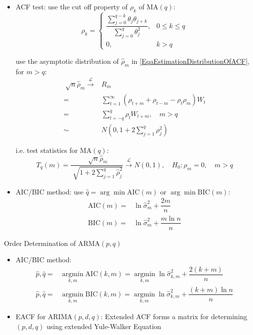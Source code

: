 \begin{itemize}[topsep=2pt,itemsep=0pt]
    \item ACF test: use the cut off property of $ \rho  _k $ of MA$ (q) $:
    \begin{equation}
        \rho  _k=\begin{cases}
            \dfrac{\sum_{j=0}^{q-k}\theta _j\theta _{j+k}}{\sum_{j=0}^q\theta _j^2},&0\leq k\leq q\\
            0,&k>q
        \end{cases} 
    \end{equation}

    use the asymptotic distribution of $ \hat{\rho }_m $ in \autoref{EqaEstimationDistributionOfACF}, for $ m>q $:
    \begin{align}
        \sqrt[]{n}\hat{\rho }_m\xrightarrow[]{\mathscr{L}}& R_m\\
         =&\sum_{t=1}^\infty(\rho _{t+m}+\rho _{t-m}-\rho _t\rho _m)W_t\\
         =&\sum_{l=-q}^q\rho _lW_{l+m},\quad m>q\\
         \sim&N(0,1+2\sum_{j=1}^q\rho _j^2)
    \end{align}
    
    i.e. test statistics for MA$ (q) $:
    \[
        T_q(m)=\dfrac{\sqrt[]{n}\hat{\rho }_m}{\sqrt[]{1+2\sum_{j=1}^q\hat{\rho }_j^2}}\xrightarrow[]{\mathscr{L}} N(0,1),\quad H_0:\rho _m=0, \quad m>q 
    \]
    
    \item AIC/BIC method: use $\hat{q}= \arg\min \mathrm{AIC}(m)  $ or $ \arg\min\mathrm{BIC}(m)  $:
    \begin{align*}
        \mathrm{AIC}(m)=&\ln \hat{\sigma }_m^2+\dfrac{2m}{n}\\
        \mathrm{BIC}(m)=&\ln \hat{\sigma }_m^2+\dfrac{m\ln n}{n}
    \end{align*}

\end{itemize}

\begin{point}
    Order Determination of ARMA$ (p,q) $
\end{point}

\begin{itemize}[topsep=2pt,itemsep=0pt]
    \item AIC/BIC method:
    \begin{align*}
        \hat{p},\hat{q}=&\mathop{\arg\min}\limits_{k,m}\mathrm{AIC}(k,m)=  \mathop{\arg\min}\limits_{k,m}\ln \hat{\sigma }^2_{k,m}+\dfrac{2(k+m)}{n}\\
        \hat{p},\hat{q}=&\mathop{\arg\min}\limits_{k,m}\mathrm{BIC}(k,m)=  \mathop{\arg\min}\limits_{k,m}\ln \hat{\sigma }^2_{k,m}+\dfrac{(k+m)\ln n}{n}
    \end{align*}
    \item EACF for ARIMA$ (p,d,q) $: Extended ACF forms a matrix for determining $ (p,d,q) $ using extended Yule-Walker Equation 
\end{itemize}

